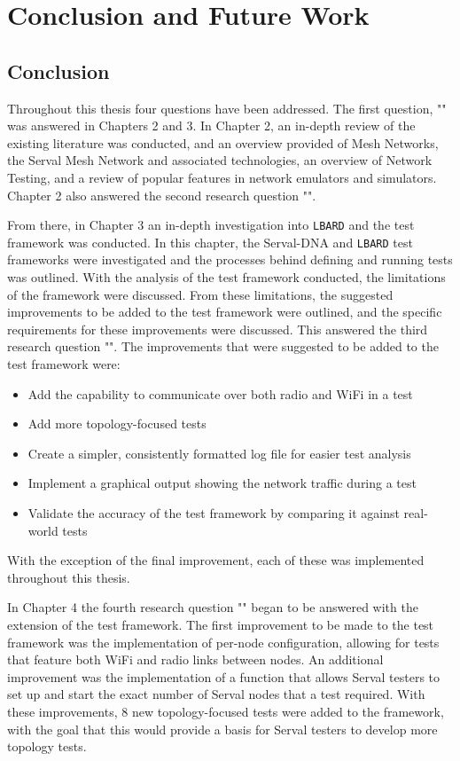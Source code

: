 
\chapter{Conclusion and Future Work} %

\label{Chapter8}

\section{Conclusion}
Throughout this thesis four questions have been addressed.
The first question, "\firstRQ" was answered in Chapters 2 and 3.
In Chapter 2, an in-depth review of the existing literature was conducted, and an overview provided of Mesh Networks, the Serval Mesh Network and associated technologies, an overview of Network Testing, and a review of popular features in network emulators and simulators.
Chapter 2 also answered the second research question "\secondRQ".

From there, in Chapter 3 an in-depth investigation into \texttt{LBARD} and the test framework was conducted.
In this chapter, the Serval-DNA and \texttt{LBARD} test frameworks were investigated and the processes behind defining and running tests was outlined. 
With the analysis of the test framework conducted, the limitations of the framework were discussed.
From these limitations, the suggested improvements to be added to the test framework were outlined, and the specific requirements for these improvements were discussed.
This answered the third research question "\thirdRQ".
The improvements that were suggested to be added to the test framework were:
\begin{itemize}
    \item Add the capability to communicate over both radio and WiFi in a test
    \item Add more topology-focused tests
    \item Create a simpler, consistently formatted log file for easier test analysis
    \item Implement a graphical output showing the network traffic during a test
    \item Validate the accuracy of the test framework by comparing it against real-world tests
\end{itemize}
With the exception of the final improvement, each of these was implemented throughout this thesis.

In Chapter 4 the fourth research question "\fourthRQ" began to be answered with the extension of the test framework.
The first improvement to be made to the test framework was the implementation of per-node configuration, allowing for tests that feature both WiFi and radio links between nodes.
An additional improvement was the implementation of a function that allows Serval testers to set up and start the exact number of Serval nodes that a test required.
With these improvements, 8 new topology-focused tests were added to the framework, with the goal that this would provide a basis for Serval testers to develop more topology tests.

